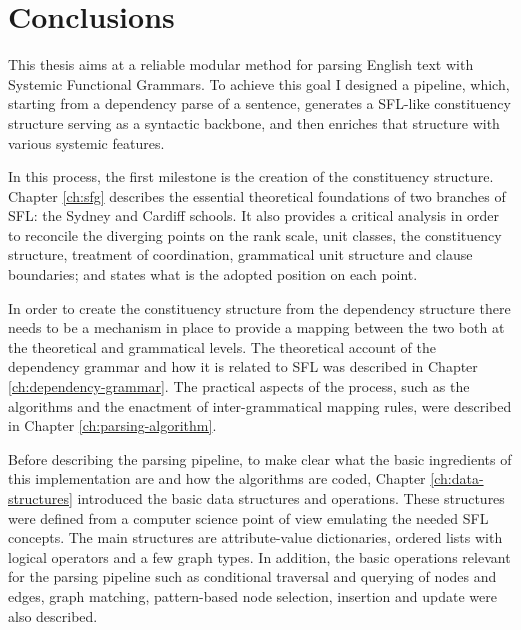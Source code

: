 \chapter{Conclusions}
\label{ch:conclusions}

    This thesis aims at a reliable modular method for parsing English text with Systemic Functional Grammars. To achieve this goal I designed a pipeline, which, starting from a dependency parse of a sentence, generates a SFL-like constituency structure serving as a syntactic backbone, and then enriches that structure with various systemic features.

    In this process, the first milestone is the creation of the constituency structure. Chapter \ref{ch:sfg} describes the essential theoretical foundations of two branches of SFL: the Sydney and Cardiff schools. It also provides a critical analysis in order to reconcile the diverging points on the rank scale, unit classes, the constituency structure, treatment of coordination, grammatical unit structure and clause boundaries; and states what is the adopted position on each point. 

    In order to create the constituency structure from the dependency structure there needs to be a mechanism in place to provide a mapping between the two both at the theoretical and grammatical levels. The theoretical account of the dependency grammar and how it is related to SFL was described in Chapter \ref{ch:dependency-grammar}. The practical aspects of the process, such as the algorithms and the enactment of inter-grammatical mapping rules, were described in Chapter \ref{ch:parsing-algorithm}. 

    Before describing the parsing pipeline, to make clear what the basic ingredients of this implementation are and how the algorithms are coded, Chapter \ref{ch:data-structures} introduced the basic data structures and operations. These structures were defined from a computer science point of view emulating the needed SFL concepts. The main structures are attribute-value dictionaries, ordered lists with logical operators and a few graph types. %
    In addition, the basic operations relevant for the parsing pipeline such as conditional traversal and querying of nodes and edges, graph matching, pattern-based node selection, insertion and update were also described.
    

